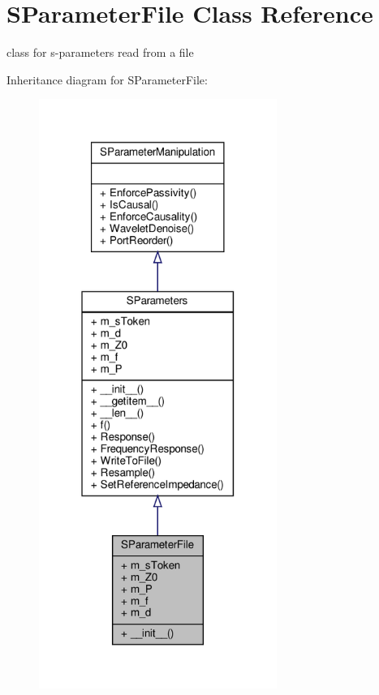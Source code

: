 \hypertarget{classSignalIntegrity_1_1SParameters_1_1SParameterFile_1_1SParameterFile}{}\section{S\+Parameter\+File Class Reference}
\label{classSignalIntegrity_1_1SParameters_1_1SParameterFile_1_1SParameterFile}


class for s-\/parameters read from a file  




Inheritance diagram for S\+Parameter\+File\+:
\nopagebreak
\begin{figure}[H]
\begin{center}
\leavevmode
\includegraphics[width=220pt]{classSignalIntegrity_1_1SParameters_1_1SParameterFile_1_1SParameterFile__inherit__graph}
\end{center}
\end{figure}


